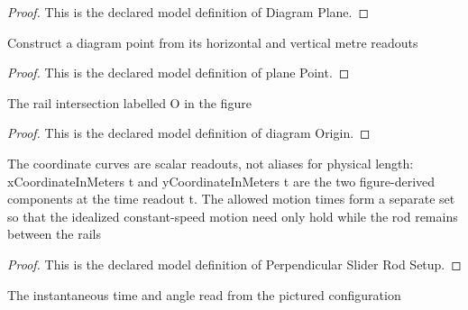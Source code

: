 \begin{proof}
  This is the declared model definition of Diagram Plane.
\end{proof}
\begin{definition}
  \label{def:physics:phyx-mini-0673:phyxminiproblems-problemphyxmini0673-planepoint}
  Construct a diagram point from its horizontal and vertical metre readouts
\end{definition}
\begin{proof}
  This is the declared model definition of plane Point.
\end{proof}
\begin{definition}
  \label{def:physics:phyx-mini-0673:phyxminiproblems-problemphyxmini0673-diagramorigin}
  The rail intersection labelled O in the figure
\end{definition}
\begin{proof}
  This is the declared model definition of diagram Origin.
\end{proof}
\begin{definition}
  \label{def:physics:phyx-mini-0673:phyxminiproblems-problemphyxmini0673-perpendicularsliderrodsetup}
  The coordinate curves are scalar readouts, not aliases for physical length: xCoordinateInMeters t and yCoordinateInMeters t are the two figure-derived components at the time readout t. The allowed motion times form a separate set so that the idealized constant-speed motion need only hold while the rod remains between the rails
\end{definition}
\begin{proof}
  This is the declared model definition of Perpendicular Slider Rod Setup.
\end{proof}
\begin{definition}
  \label{def:physics:phyx-mini-0673:phyxminiproblems-problemphyxmini0673-figureobservation}
  The instantaneous time and angle read from the pictured configuration
\end{definition}
